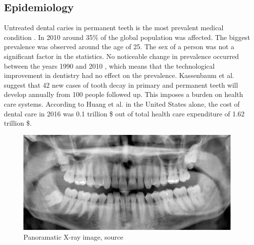 \subsection{Epidemiology}
Untreated dental caries in permanent teeth is the most prevalent medical condition \cite{Kassebaum2015}. In 2010 around 35\% of the global population was affected. The biggest prevalence was observed around the age of 25. The sex of a person was not a significant factor in the statistics. No noticeable change in prevalence occurred between the years 1990 and 2010 \cite{Kassebaum2015} \cite{Frencken2017}, which means that the technological improvement in dentistry had no effect on the prevalence.
Kassenbaum et al. suggest that 42 new cases of tooth decay in primary and permanent teeth will develop annually from 100 people followed up. This imposes a burden on health care systems. According to Huang et al. \cite{Hung2020} in the United States alone, the cost of dental care in 2016 was 0.1 trillion \$ out of total health care expenditure of 1.62 trillion \$.

\begin{figure}
    \centering
    \includegraphics[width=\linewidth]{images/panoramatic_xray.jpg}
    \caption{Panoramatic X-ray image, source \cite{Panoramatic2017}}
    \label{fig:panoramatic_xray}
\end{figure}


